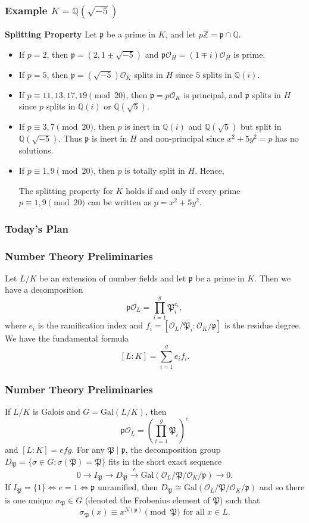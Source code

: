 \documentclass{beamer}
\newcommand{\Gal}{\mathrm{Gal}}
\newcommand{\PP}{\mathfrak{P}}
\newcommand{\QQ}{\mathbb{Q}}
\newcommand{\ZZ}{\mathbb{Z}}
\newcommand{\pp}{\mathfrak{p}}
\theoremstyle{plain}
\begin{document}
\begin{frame}
    \frametitle{Example $K=\QQ(\sqrt{-5})$}
    \textbf{Splitting Property}
    Let $\pp$ be a prime in $K$, and let $p\ZZ=\pp\cap\QQ$. 
    \begin{itemize}
        \item If $p=2$, then $\pp=(2,1\pm\sqrt{-5})$ and $\pp\mathcal{O}_H=(1\mp i)\mathcal{O}_H$ is prime.
        \item If $p=5$, then $\pp=(\sqrt{-5})\mathcal{O}_K$ splits in $H$ since $5$ splits in $\QQ(i)$.
        \item If $p\equiv 11,13,17,19 \pmod{20}$, then $\pp=p\mathcal{O}_K$ is principal, and $\pp$ splits in $H$ since $p$ splits in $\QQ(i)$ or $\QQ(\sqrt{5})$.
        \item If $p\equiv 3,7\pmod{20}$, then $p$ is inert in $\QQ(i)$ and $\QQ(\sqrt{5})$ but split in $\QQ(\sqrt{-5})$. Thus $\pp$ is inert in $H$ and non-principal since $x^2+5y^2=p$ has no solutions.
        \item If $p\equiv 1,9\pmod{20}$, then $p$ is totally split in $H$. Hence,
        \begin{corollary}
            The splitting property for $K$ holds if and only if every prime $p\equiv1,9\pmod{20}$ can be written as $p=x^2+5y^2$. 
        \end{corollary}
    \end{itemize}
\end{frame}

\begin{frame}
    \frametitle{Today's Plan}
    
\end{frame}


\begin{frame}
    \frametitle{Number Theory Preliminaries}
    Let $L/K$ be an extension of number fields and let $\pp$ be a prime in $K$. Then we have a decomposition
    $$\pp\mathcal{O}_L=\prod_{i=1}^g\PP_i^{e_i},$$
    where $e_i$ is the ramification index and $f_i=[\mathcal{O}_L/\PP_i:\mathcal{O}_K/\pp]$ is the residue degree. We have the fundamental formula
    $$[L:K]=\sum_{i=1}^ge_if_i.$$
    
\end{frame}


\begin{frame}
    \frametitle{Number Theory Preliminaries}
    If $L/K$ is Galois and $G=\Gal(L/K)$, then 
    $$\pp\mathcal{O}_L=\left(\prod_{i=1}^g\PP_i\right)^e$$
    and $[L:K]=efg$. For any $\PP\mid\pp$, the decomposition group $D_\PP=\{\sigma\in G:\sigma(\PP)=\PP\}$ fits in the short exact sequence
    $$0\longrightarrow I_\PP\longrightarrow D_\PP\xrightarrow{\ \epsilon\ }\Gal(\mathcal{O}_L/\PP/\mathcal{O}_K/\pp)\longrightarrow0.$$
    If $I_\PP=\{1\}\iff e=1\iff \pp$ unramified, then $D_\PP\cong \Gal(\mathcal{O}_L/\PP/\mathcal{O}_K/\pp)$ and so there is one unique $\sigma_{\PP}\in G$ (denoted the Frobenius element of $\PP$) such that 
    $$\sigma_{\PP}(x)\equiv x^{N(\pp)}\pmod{\PP}\text{ for all }x\in L.$$
\end{frame}
\end{document}

